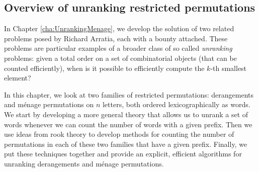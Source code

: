 \subsection{Overview of unranking restricted permutations}
In Chapter \ref{cha:UnrankingMenage}, we develop the solution of two related
problems posed by Richard Arratia, each with a bounty attached.
These problems are particular examples of a broader class of so called
\textit{unranking} problems:
given a total order on a set of combinatorial objects (that can be counted
efficiently), when is it possible to efficiently compute the $k$-th smallest
element?

In this chapter, we look at two families of restricted permutations:
derangements and m\'enage permutations on $n$ letters, both ordered
lexicographically as words.
We start by developing a more general theory that allows us to unrank a set
of words whenever we can count the number of words with a given prefix.
Then we use ideas from rook theory to develop methods for counting the number
of permutations in each of these two families that have a given prefix.
Finally, we put these techniques together and provide an explicit, efficient
algorithms for unranking derangements and m\'enage permutations.

